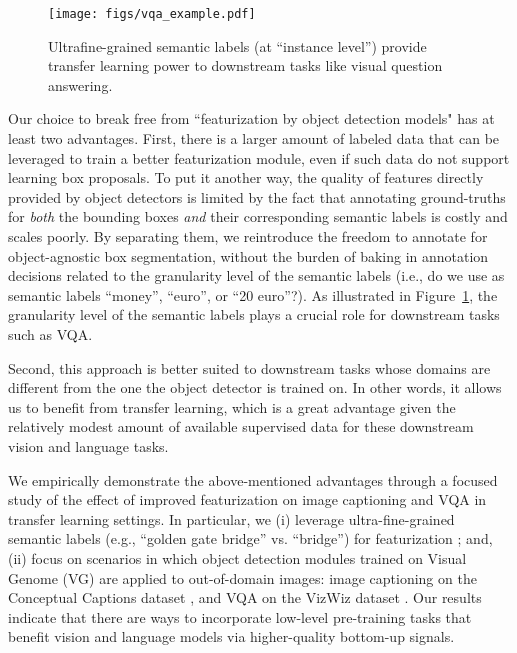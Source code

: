 \documentclass[11pt,a4paper]{article}
\begin{document}
\begin{figure}[t]
\begin{center}
 \texttt{[image: figs/vqa\_example.pdf]}
\end{center}
 \vspace{-6pt}
 \caption{Ultrafine-grained semantic labels (at ``instance level'') provide transfer learning power to downstream tasks like visual question answering.}
\label{fig:examples}
\vspace{-12pt}
\end{figure}

Our choice to break free from ``featurization by object detection models" has at least two advantages.
First, there is a larger amount of labeled data that can be leveraged to train a better featurization module, even if such data do not support learning box proposals.
To put it another way, the quality of features directly provided by object detectors is limited by the fact that annotating ground-truths for \emph{both} the bounding boxes {\em and} their corresponding semantic labels is costly and scales poorly.
By separating them, we reintroduce the freedom to annotate for object-agnostic box segmentation, without the burden of baking in annotation decisions related to the granularity level of the semantic labels (i.e., do we use as semantic labels ``money'', ``euro'', or ``20 euro''?).
As illustrated in Figure~\ref{fig:examples}, the granularity level of the semantic labels plays a crucial role for downstream tasks such as VQA.

Second, this approach is better suited to downstream tasks whose domains are different from the one the object detector is trained on.
In other words, it allows us to benefit from transfer learning, which is a great advantage given the relatively modest amount of available supervised data for these downstream vision and language tasks.

We empirically demonstrate the above-mentioned advantages through a focused study of the effect of improved featurization on image captioning and VQA in transfer learning settings.
In particular, we (i) leverage ultra-fine-grained semantic labels (e.g., ``golden gate bridge'' vs. ``bridge'') for featurization \cite{juan19graphrise};
and, (ii) focus on scenarios in which object detection modules trained on Visual Genome (VG) \cite{krishnavisualgenome} are applied to out-of-domain images:
image captioning on the Conceptual Captions dataset \cite{sharma2018conceptual}, and VQA on the VizWiz dataset \cite{gurari18vizwiz}.
Our results indicate that there are ways to incorporate low-level pre-training tasks that benefit vision and language models via higher-quality bottom-up signals.
\end{document}
